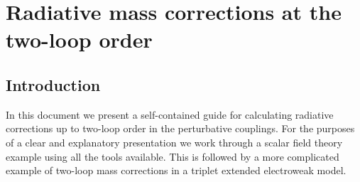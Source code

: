 \documentclass[11pt]{article}
\begin{document}
\section{Radiative mass corrections at the two-loop order}

\subsection{Introduction}

In this document we present a self-contained guide for calculating radiative corrections up to two-loop order in the perturbative couplings.  For the purposes of a clear and explanatory presentation we work through a scalar field theory example using all the tools available.  This is followed by a more complicated example of two-loop mass corrections in a triplet extended electroweak model.\\
\end{document}
